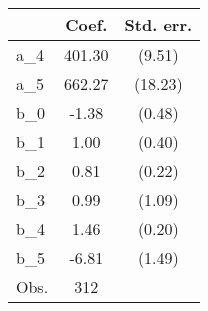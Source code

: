 {
\def\sym#1{\ifmmode^{#1}\else\(^{#1}\)\fi}
\begin{tabular}{l*{1}{cc}}
\hline\hline
                &    Coef.&Std. err.\\
\hline
a\_4             &   401.30&   (9.51)\\
a\_5             &   662.27&  (18.23)\\
b\_0             &    -1.38&   (0.48)\\
b\_1             &     1.00&   (0.40)\\
b\_2             &     0.81&   (0.22)\\
b\_3             &     0.99&   (1.09)\\
b\_4             &     1.46&   (0.20)\\
b\_5             &    -6.81&   (1.49)\\
\hline
Obs.            &      312&         \\
\hline\hline
\end{tabular}
}
